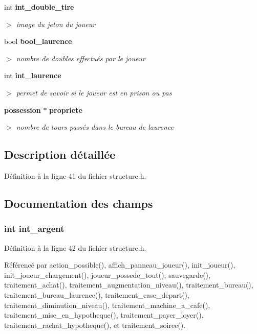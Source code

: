 \begin{CompactItemize}
int {\bf int\_\-double\_\-tire}
\begin{CompactList}\small\item\em $>$ image du jeton du joueur \item\end{CompactList}\item 
bool {\bf bool\_\-laurence}
\begin{CompactList}\small\item\em $>$ nombre de doubles effectu\'{e}s par le joueur \item\end{CompactList}\item 
int {\bf int\_\-laurence}
\begin{CompactList}\small\item\em $>$ permet de savoir si le joueur est en prison ou pas \item\end{CompactList}\item 
{\bf possession} $\ast$ {\bf propriete}
\begin{CompactList}\small\item\em $>$ nombre de tours pass\'{e}s dans le bureau de laurence \item\end{CompactList}\end{CompactItemize}


\subsection{Description d\'{e}taill\'{e}e}




D\'{e}finition \`{a} la ligne 41 du fichier structure.h.

\subsection{Documentation des champs}
\subsubsection{\setlength{\rightskip}{0pt plus 5cm}int {\bf int\_\-argent}}\label{structjoueur_b82f4fde3382a41ee393fc1c64f9beb8}




D\'{e}finition \`{a} la ligne 42 du fichier structure.h.

R\'{e}f\'{e}renc\'{e} par action\_\-possible(), affich\_\-panneau\_\-joueur(), init\_\-joueur(), init\_\-joueur\_\-chargement(), joueur\_\-possede\_\-tout(), sauvegarde(), traitement\_\-achat(), traitement\_\-augmentation\_\-niveau(), traitement\_\-bureau(), traitement\_\-bureau\_\-laurence(), traitement\_\-case\_\-depart(), traitement\_\-diminution\_\-niveau(), traitement\_\-machine\_\-a\_\-cafe(), traitement\_\-mise\_\-en\_\-hypotheque(), traitement\_\-payer\_\-loyer(), traitement\_\-rachat\_\-hypotheque(), et traitement\_\-soiree().
